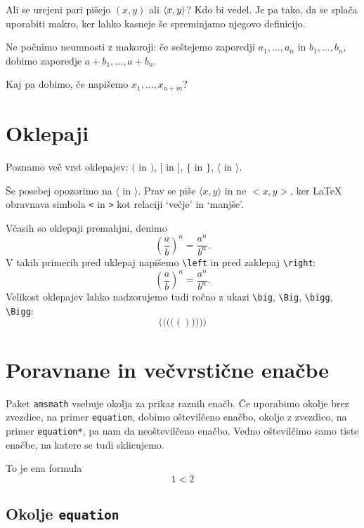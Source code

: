 \documentclass{amsart}
\begin{document}
Ali se urejeni pari pišejo $(x, y)$ ali $\langle x, y \rangle$? Kdo bi vedel. Je pa tako, da se
splača uporabiti makro, ker lahko kasneje še spreminjamo njegovo definicijo.

\newcommand{\zap}[2]{#1_1, \ldots, #1_{#2}}

Ne počnimo neumnosti z makoroji: če seštejemo zaporedji $\zap a n$ in $\zap{b}{n}$,
dobimo zaporedje $\zap{a + b}{n}$.

Kaj pa dobimo, če napišemo $\zap{x}{n + m}$?

\section{Oklepaji}
\label{sec:oklepaji}

Poznamo več vrst oklepajev: $($ in $)$, $[$ in $]$, $\{$ in $\}$, $\langle$ in $\rangle$.

Še posebej opozorimo na $\langle$ in $\rangle$. Prav se piše $\langle x, y\rangle$ in ne
$<x, y>$, ker {\LaTeX} obravnava simbola \texttt{<} in \texttt{>} kot relaciji `večje' in
`manjše'.

Včasih so oklepaji premahjni, denimo
%
\[
  (\frac{a}{b})^n = \frac{a^n}{b^n}.
\]
%
V takih primerih pred uklepaj napišemo \verb|\left| in pred zaklepaj \verb|\right|:
%
\[
  \left(\frac{a}{b}\right)^n = \frac{a^n}{b^n}.
\]
%
Velikost oklepajev lahko nadzorujemo tudi ročno z ukazi \verb|\big|, \verb|\Big|,
\verb|\bigg|, \verb|\Bigg|:
%
\[
  \Bigg( \bigg( \Big( \big( ( ) \big) \Big) \bigg) \Bigg)
\]


\section{Poravnane in večvrstične enačbe}
\label{sec:enacbe}

Paket \texttt{amsmath} vsebuje okolja za prikaz raznih enačb. Če uporabimo okolje brez
zvezdice, na primer \texttt{equation}, dobimo oštevilčeno enačbo, okolje z zvezdico, na
primer \texttt{equation*}, pa nam da neoštevilčeno enačbo. Vedno oštevilčimo samo tiste
enačbe, na katere se tudi sklicujemo.

To je ena formula
%
\begin{equation}
  \label{eq:lepa-enacba}
  1 < 2
\end{equation}


\subsection{Okolje \texttt{equation}}
\end{document}
